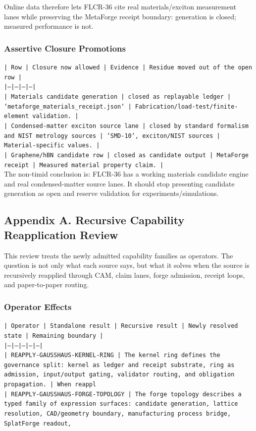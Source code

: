 \documentclass[11pt]{article}
\begin{document}
Online data therefore lets FLCR-36 cite real materials/exciton measurement lanes while preserving the MetaForge receipt boundary: generation is closed; measured performance is not.

\subsubsection*{Assertive Closure Promotions}

\noindent\texttt{| Row | Closure now allowed | Evidence | Residue moved out of the open row |}\\
\noindent\texttt{|---|---|---|---|}\\
\noindent\texttt{| Materials candidate generation | closed as replayable ledger | `metaforge\_materials\_receipt.json` | Fabrication/load-test/finite-element validation. |}\\
\noindent\texttt{| Condensed-matter exciton source lane | closed by standard formalism and NIST metrology sources | `SMD-10`, exciton/NIST sources | Material-specific values. |}\\
\noindent\texttt{| Graphene/hBN candidate row | closed as candidate output | MetaForge receipt | Measured material property claim. |}\\

The non-timid conclusion is: FLCR-36 has a working materials candidate engine and real condensed-matter source lanes. It should stop presenting candidate generation as open and reserve validation for experiments/simulations.

\subsection*{Appendix A. Recursive Capability Reapplication Review}

This review treats the newly admitted capability families as operators. The question is not only what each source says, but what it solves when the source is recursively reapplied through CAM, claim lanes, forge admission, receipt loops, and paper-to-paper routing.

\subsubsection*{Operator Effects}

\noindent\texttt{| Operator | Standalone result | Recursive result | Newly resolved state | Remaining boundary |}\\
\noindent\texttt{|---|---|---|---|---|}\\
\noindent\texttt{| REAPPLY-GAUSSHAUS-KERNEL-RING | The kernel ring defines the governance split: kernel as ledger and receipt substrate, ring as admission, input/output gating, validator routing, and obligation propagation. | When reappl}\\
\noindent\texttt{| REAPPLY-GAUSSHAUS-FORGE-TOPOLOGY | The forge topology describes a typed family of expression surfaces: candidate generation, lattice resolution, CAD/geometry boundary, manufacturing process bridge, SplatForge readout, }\\
\end{document}
